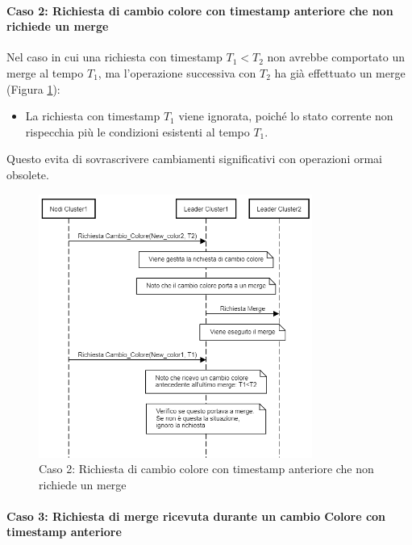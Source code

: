 \documentclass[12pt, a4paper]{report}
\begin{document}
\newpage
\paragraph{Caso 2: Richiesta di cambio colore con timestamp anteriore che non richiede un merge}\label{par:case2}

Nel caso in cui una richiesta con timestamp $T_1 < T_2$ non avrebbe comportato un merge al tempo $T_1$, ma l'operazione successiva con $T_2$ ha già effettuato un merge (Figura \ref{fig:caso2_concorrenza}):

\begin{itemize}
    \item La richiesta con timestamp $T_1$ viene ignorata, poiché lo stato corrente non rispecchia più le condizioni esistenti al tempo $T_1$.
\end{itemize}

Questo evita di sovrascrivere cambiamenti significativi con operazioni ormai obsolete.

\begin{figure}[H]
    \centering
    \includegraphics[width=0.8\textwidth,align=t]{images/concorrenza/caso2.png}
    \caption{Caso 2: Richiesta di cambio colore con timestamp anteriore che non richiede un merge}
    \label{fig:caso2_concorrenza}
\end{figure}

\newpage
\paragraph{Caso 3: Richiesta di merge ricevuta durante un cambio Colore con timestamp anteriore}\label{par:case3}
\end{document}
